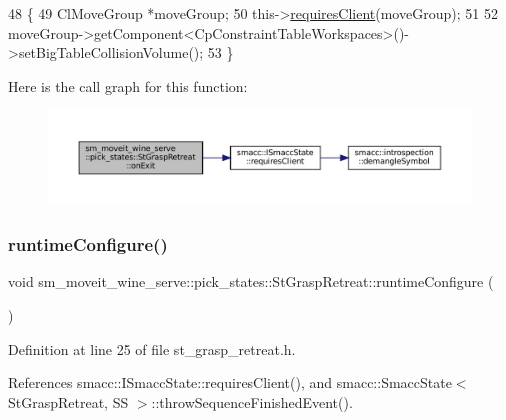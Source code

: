 \begin{DoxyCode}
48     \{
49         ClMoveGroup *moveGroup;
50         this->\hyperlink{classsmacc_1_1ISmaccState_a7f95c9f0a6ea2d6f18d1aec0519de4ac}{requiresClient}(moveGroup);
51         
52         moveGroup->getComponent<CpConstraintTableWorkspaces>()->setBigTableCollisionVolume();
53     \}
\end{DoxyCode}
Here is the call graph for this function\+:
\nopagebreak
\begin{figure}[H]
\begin{center}
\leavevmode
\includegraphics[width=350pt]{structsm__moveit__wine__serve_1_1pick__states_1_1StGraspRetreat_a4fe329e46e9a5df3c54cd8fae48facd5_cgraph}
\end{center}
\end{figure}
\mbox{\label{structsm__moveit__wine__serve_1_1pick__states_1_1StGraspRetreat_a5c46ccb270eeff460cc652656f748c23}} 
\subsubsection{\texorpdfstring{runtime\+Configure()}{runtimeConfigure()}}
{\footnotesize\ttfamily void sm\+\_\+moveit\+\_\+wine\+\_\+serve\+::pick\+\_\+states\+::\+St\+Grasp\+Retreat\+::runtime\+Configure (\begin{DoxyParamCaption}{ }\end{DoxyParamCaption})\hspace{0.3cm}{\ttfamily [inline]}}



Definition at line 25 of file st\+\_\+grasp\+\_\+retreat.\+h.



References smacc\+::\+I\+Smacc\+State\+::requires\+Client(), and smacc\+::\+Smacc\+State$<$ St\+Grasp\+Retreat, S\+S $>$\+::throw\+Sequence\+Finished\+Event().


